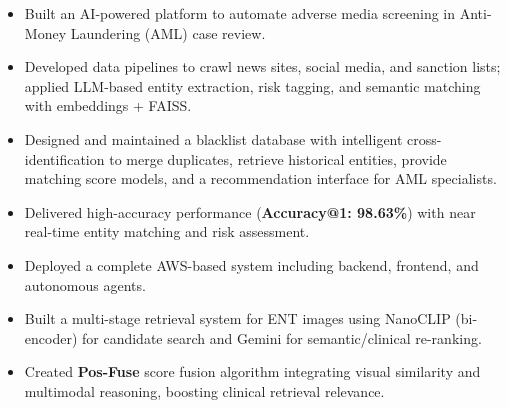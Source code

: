 \documentclass[11pt,a4paper,sans]{moderncv}
\begin{document}
{\begin{itemize}

  \item Built an AI-powered platform to automate adverse media screening in Anti-Money Laundering (AML) case review.

  \item Developed data pipelines to crawl news sites, social media, and sanction lists; applied LLM-based entity extraction, risk tagging, and semantic matching with embeddings + FAISS.

  \item Designed and maintained a blacklist database with intelligent cross-identification to merge duplicates, retrieve historical entities, provide matching score models, and a recommendation interface for AML specialists.

  \item Delivered high-accuracy performance (\textbf{Accuracy@1: 98.63\%}) with near real-time entity matching and risk assessment.

  \item Deployed a complete AWS-based system including backend, frontend, and autonomous agents.

\end{itemize}}








{\begin{itemize}

  \item Built a multi-stage retrieval system for ENT images using NanoCLIP (bi-encoder) for candidate search and Gemini for semantic/clinical re-ranking.

  \item Created \textbf{Pos-Fuse} score fusion algorithm integrating visual similarity and multimodal reasoning, boosting clinical retrieval relevance.

\end{itemize}}



\end{document}
